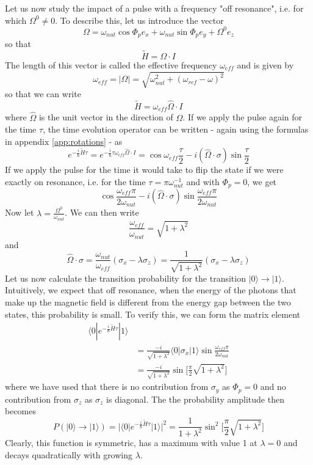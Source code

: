\documentclass[a4paper, draft]{article}
\theoremstyle{own}
\theoremstyle{remark}
\begin{document}
Let us now study the impact of a pulse with a frequency "off resonance", i.e. for which $\Omega^0 \neq 0$. To describe this, let us introduce the vector
$$
\Omega =  \omega_{nut} \cos \Phi_p e_x  +  \omega_{nut} \sin \Phi_p e_y + \Omega^0 e_z
$$
so that 
$$
\widetilde{H} = \Omega \cdot I
$$
The length of this vector is called the effective frequency $\omega_{eff}$ and is given by
$$
\omega_{eff} = |\Omega| = \sqrt{\omega_{nut}^2 + (\omega_{ref} - \omega)^2}
$$
so that we can write
$$
\widetilde{H} = \omega_{eff} \hat{\Omega} \cdot I
$$
where $\hat{\Omega}$ is the unit vector in the direction of $\Omega$. If we apply the pulse again for the time $\tau$, the time evolution operator can be written - again using the formulas in appendix \ref{app:rotations} - as
$$
e^{-\frac{i}{\hbar} \widetilde{H} \tau} = e^{-\frac{i}{\hbar} \tau \omega_{eff} \hat{\Omega} \cdot I } = \cos \omega_{eff} \frac{\tau}{2} - i (\hat{\Omega} \cdot \sigma) \sin \frac{\tau}{2}
$$
If we apply the pulse for the time it would take to flip the state if we were exactly on resonance, i.e. for the time $\tau = \pi  \omega_{nut}^{-1}$ and with $\Phi_p = 0$, we get
$$
\cos \frac{\omega_{eff}\pi }{2\omega_{nut}} - i (\hat{\Omega} \cdot \sigma) \sin  \frac{\omega_{eff}\pi }{2\omega_{nut}}
$$
Now let $\lambda = \frac{\Omega^0}{\omega_{nut}}$. We can then write
$$
\frac{\omega_{eff}}{\omega_{nut}} = \sqrt{1+\lambda^2}
$$
and
$$
\hat{\Omega} \cdot \sigma =  \frac{\omega_{nut}}{\omega_{eff}} (\sigma_x - \lambda \sigma_z) 
=
\frac{1}{\sqrt{1+\lambda^2}} (\sigma_x - \lambda \sigma_z)
$$
Let us now calculate the transition probability for the transition $|0 \rangle \rightarrow |1 \rangle$. Intuitively, we expect that off resonance, when the energy of the photons that make up the magnetic field is different from the energy gap between the two states, this probability is small. To verify this, we can form the matrix element
\begin{align*}
\langle 0 | e^{-\frac{i}{\hbar} \widetilde{H} \tau} | 1 \rangle \\
 &=
\frac{-i}{\sqrt{1+\lambda^2}}  \langle 0 | \sigma_x | 1 \rangle 
\sin  \frac{\omega_{eff}\pi }{2\omega_{nut}} \\
&= \frac{-i}{\sqrt{1+\lambda^2}} \sin  \big[ \frac{\pi}{2}\sqrt{1+\lambda^2} \big] 
\end{align*}
where we have used that there is no contribution from $\sigma_y$ as $\Phi_p = 0$ and no contribution from $\sigma_z$ as $\sigma_z$ is diagonal. The the probability amplitude then becomes
$$
P(|0 \rangle \rightarrow |1 \rangle) = | \langle 0 | e^{-\frac{i}{\hbar} \widetilde{H} \tau} | 1 \rangle |^2 = \frac{1}{1+\lambda^2} \sin^2 \big[ \frac{\pi}{2}  \sqrt{1+\lambda^2} \big] 
$$
Clearly, this function is symmetric, has a maximum with value 1 at $\lambda = 0$ and decays quadratically with growing $\lambda$. 
\end{document}
